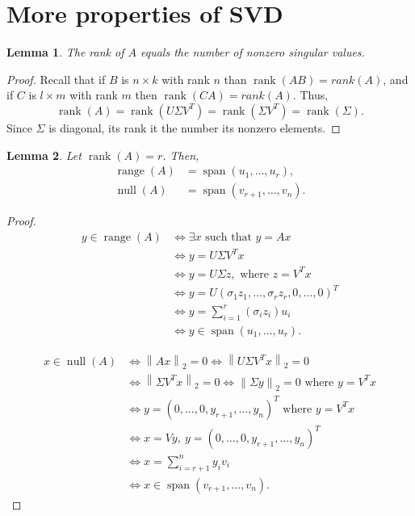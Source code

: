 \documentclass{article}
\newtheorem{lemma}{Lemma}[section]
\newcommand{\norm}[1]{\left \lVert #1 \right \rVert}
\begin{document}
\section{More properties of SVD}


\begin{lemma}
The rank of $A$ equals the number of nonzero singular values.
\end{lemma}
\begin{proof}
Recall that if $B$ is $n \times k$ with rank $n$ than
$\operatorname{rank} (AB) = rank (A)$, and if $C$ is $l \times m$
with rank $m$ then $\operatorname{rank} (CA) = rank (A)$. Thus,
\begin{equation*}
\operatorname{rank} (A) = \operatorname{rank} (U \Sigma V^{T}) =
\operatorname{rank} (\Sigma V^{T}) = \operatorname{rank} (\Sigma).
\end{equation*}
Since $\Sigma$ is diagonal, its rank it the number its nonzero
elements.
\end{proof}

\begin{lemma}
Let $\operatorname{rank}(A)=r$.
Then,
\begin{align*}
\operatorname{range}(A) &= \operatorname{span}(u_{1},\ldots,u_{r}),\\
\operatorname{null}(A) &= \operatorname{span}(v_{r+1},\ldots,v_{n}).
\end{align*}
\end{lemma}

\begin{proof}
\begin{align*}
y \in \operatorname{range}(A) & \iff \exists x \text{ such that }
y=Ax \\
& \iff y=U\Sigma V^{T}x \\
& \iff y=U \Sigma z, \text{ where }z=V^{T}x \\
& \iff y = U \left (\sigma_{1} z_{1},\ldots,\sigma_r z_{r}, 0
,\ldots,0 \right )^{T} \\
& \iff y=\sum_{i=1}^{r} (\sigma_{i}z_{i}) u_{i} \\
& \iff y \in \operatorname{span} (u_{1},\ldots, u_{r}).
\end{align*}

\medskip

\begin{align*}
x \in \operatorname{null}(A) &\iff \norm{Ax}_{2}=0 \iff
\norm{U\Sigma V^{T} x}_{2}=0 \\
& \iff \norm{\Sigma V^{T}x}_{2} = 0 \iff \norm{\Sigma y}_{2} =0
\text{ where } y=V^{T}x \\
& \iff y=\left (0 ,\ldots,0,y_{r+1},\ldots,y_{n} \right
)^{T} \text{ where } y=V^{T}x\\
& \iff x=Vy,\ y=\left (0 ,\ldots,0,y_{r+1},\ldots,y_{n}
\right )^{T} \\
& \iff x=\sum_{i=r+1}^{n} y_{i} v_{i} \\
& \iff x \in \operatorname{span}(v_{r+1},\ldots,v_{n}).
\end{align*}

\end{proof}
\end{document}
